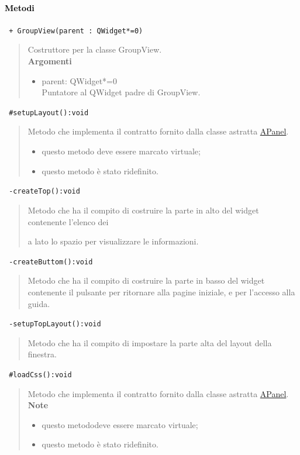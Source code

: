 \paragraph{\textcolor{black}{Metodi\\}}
\color{blue}\verb! + GroupView(parent : QWidget*=0)!
\begin{quote}
\color{black}Costruttore per la classe GroupView. \\
\textbf{Argomenti}
\begin{itemize}
\item parent: QWidget*=0  \\ Puntatore al QWidget padre di GroupView.
\end{itemize}
\end{quote}
\color{blue}\verb! #setupLayout():void!
\begin{quote}
\color{black} Metodo che implementa il contratto fornito dalla classe astratta \hyperref[speAPanel]{APanel}.
\begin{itemize}
\item questo metodo deve essere marcato virtuale;
\item questo metodo è stato ridefinito.
\end{itemize}
\end{quote} 
\color{blue}\verb! -createTop():void!
\begin{quote}
\color{black} Metodo che ha il compito di costruire la parte in alto del widget contenente l'elenco dei \subject e a lato lo spazio per visualizzare le informazioni.
\end{quote} 
\color{blue}\verb! -createButtom():void!
\begin{quote}
\color{black} Metodo che ha il compito di costruire la parte in basso del widget contenente il pulsante per ritornare alla pagine iniziale, e per l'accesso alla guida.
\end{quote}
\color{blue}\verb! -setupTopLayout():void!
\begin{quote}
\color{black} Metodo che ha il compito di impostare la parte alta del layout della finestra.
\end{quote}  
\color{blue}\verb! #loadCss():void!
\begin{quote}
\color{black} Metodo che implementa il contratto fornito dalla classe astratta \hyperref[speAPanel]{APanel}.\\
 \textbf{Note}
 \begin{itemize}
  \item questo metododeve essere marcato virtuale;
 \item questo metodo è stato ridefinito.
 \end{itemize}
\end{quote} 
